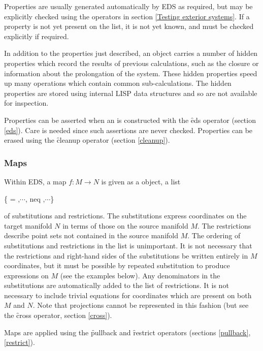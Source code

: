 Properties are usually generated automatically by EDS as required, but may
be explicitly checked using the operators in section \ref{Testing exterior
systems}. If a property is not yet present on the list, it is not yet
known, and must be checked explicitly if required.

In addition to the properties just described, an  object carries
a number of hidden properties which record the results of previous
calculations, such as the closure or information about the prolongation of
the system. These hidden properties speed up many operations which
contain common sub-calculations. The hidden properties are stored using
internal LISP data structures and so are not available for inspection.

Properties can be asserted when an  is constructed with the
\f{eds} operator (section \ref{eds}). Care is needed since such assertions
are never checked. Properties can be erased using the \f{cleanup} operator
(section \ref{cleanup}).

\subsubsection{Maps}
\label{Maps}

Within EDS, a map $f:M\to N$ is given as a  object, a list 
\begin{edssyntax}
\{ = ,$\cdots$, neq ,$\cdots$\}
\end{edssyntax}
of substitutions and restrictions. The substitutions express coordinates on
the target manifold $N$ in terms of those on the source manifold $M$. The
restrictions describe point sets not contained in the source manifold
$M$. The ordering of substitutions and restrictions in the list is
unimportant. It is not necessary that the restrictions and right-hand sides
of the substitutions be written entirely in $M$ coordinates, but it must be
possible by repeated substitution to produce expressions on $M$ (see the
examples below). Any denominators in the substitutions are automatically
added to the list of restrictions. It is not necessary to include trivial
equations for coordinates which are present on both $M$ and $N$. Note that
projections cannot be represented in this fashion (but see the \f{cross}
operator, section \ref{cross}).

Maps are applied using the \f{pullback} and \f{restrict} operators
(sections \ref{pullback}, \ref{restrict}).

